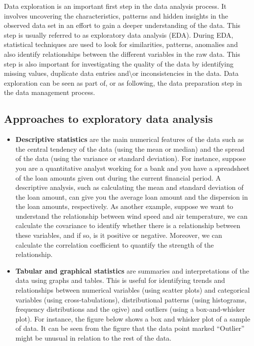 \documentclass[
]{book}
\begin{document}
Data exploration is an important first step in the data analysis process. It involves uncovering the characteristics, patterns and hidden insights in the observed data set in an effort to gain a deeper understanding of the data. This step is usually referred to as exploratory data analysis (EDA). During EDA, statistical techniques are used to look for similarities, patterns, anomalies and also identify relationships between the different variables in the raw data. This step is also important for investigating the quality of the data by identifying missing values, duplicate data entries and\textbackslash or inconsistencies in the data. Data exploration can be seen as part of, or as following, the data preparation step in the data management process.

\subsection{Approaches to exploratory data analysis}\label{approaches-to-exploratory-data-analysis}

\begin{itemize}
\item
  \textbf{Descriptive statistics} are the main numerical features of the data such as the central tendency of the data (using the mean or median) and the spread of the data (using the variance or standard deviation). For instance, suppose you are a quantitative analyst working for a bank and you have a spreadsheet of the loan amounts given out during the current financial period. A descriptive analysis, such as calculating the mean and standard deviation of the loan amount, can give you the average loan amount and the dispersion in the loan amounts, respectively. As another example, suppose we want to understand the relationship between wind speed and air temperature, we can calculate the covariance to identify whether there is a relationship between these variables, and if so, is it positive or negative. Moreover, we can calculate the correlation coefficient to quantify the strength of the relationship.
\item
  \textbf{Tabular and graphical statistics} are summaries and interpretations of the data using graphs and tables. This is useful for identifying trends and relationships between numerical variables (using scatter plots) and categorical variables (using cross-tabulations), distributional patterns (using histograms, frequency distributions and the ogive) and outliers (using a box-and-whisker plot). For instance, the figure below shows a box and whisker plot of a sample of data. It can be seen from the figure that the data point marked ``Outlier'' might be unusual in relation to the rest of the data.
\end{itemize}
\end{document}
